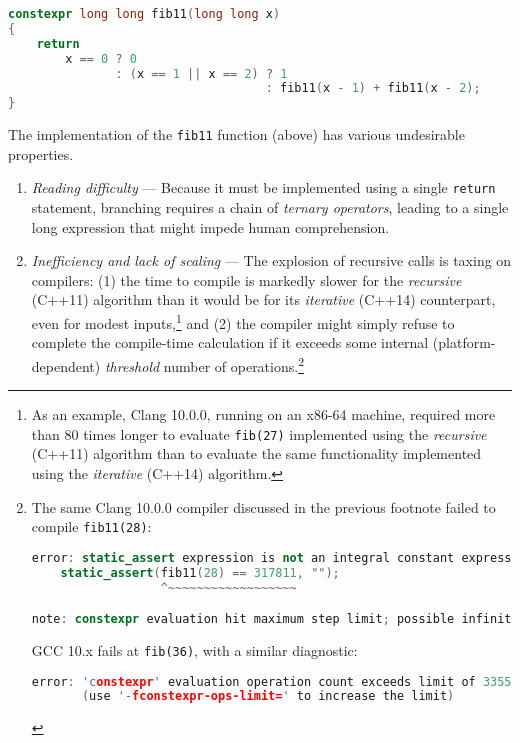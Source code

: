 \begin{lstlisting}[language=C++]
constexpr long long fib11(long long x)
{
    return
        x == 0 ? 0
               : (x == 1 || x == 2) ? 1
                                    : fib11(x - 1) + fib11(x - 2);
}
\end{lstlisting}

\noindent The implementation of the \texttt{fib11} function (above) has various
undesirable properties.
\begin{enumerate}
\item{\emph{Reading difficulty} — Because it must be implemented using a single \texttt{return} statement, branching requires a chain of \emph{ternary operators}, leading to a single long expression that might impede human comprehension.}
\item{\emph{Inefficiency and lack of scaling} — The explosion of recursive calls is taxing on compilers: (1) the time to compile is markedly slower for the \emph{recursive} (C++11) algorithm than it would be for its \emph{iterative} (C++14) counterpart, even for modest inputs,{\cprotect\footnote{As an example, Clang 10.0.0, running on an x86-64 machine, required more than 80 times longer to evaluate \texttt{fib(27)} implemented using the \emph{recursive} (C++11) algorithm than to evaluate the same functionality implemented using the \emph{iterative} (C++14) algorithm.}} and (2) the compiler might simply refuse to complete the compile-time calculation if it exceeds some internal (platform-dependent) \emph{threshold} number of operations.{\cprotect\footnote{The same Clang 10.0.0 compiler discussed in the previous footnote failed to compile \texttt{fib11(28)}:

\begin{lstlisting}[language=C++, basicstyle={\ttfamily\footnotesize}]
error: static_assert expression is not an integral constant expression
    static_assert(fib11(28) == 317811, "");
                  ^~~~~~~~~~~~~~~~~~~

note: constexpr evaluation hit maximum step limit; possible infinite loop?
\end{lstlisting}

\noindent GCC 10.x fails at \texttt{fib(36)}, with a similar diagnostic:

\begin{lstlisting}[language=C++, basicstyle={\ttfamily\footnotesize}]
error: 'constexpr' evaluation operation count exceeds limit of 33554432
       (use '-fconstexpr-ops-limit=' to increase the limit)
\end{lstlisting}

}}}
\end{enumerate}
